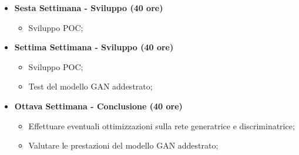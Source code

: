 {\begin{itemize}
\begin{itemize}
                  \item Raccogliere un dataset appropriato per l'addestramento del GAN;
                  \item Preprocessare il dataset per adattarlo al formato richiesto dal framework;
              \end{itemize}
        \item \textbf{Sesta Settimana - Sviluppo (40 ore)}
              \begin{itemize}
                  \item Sviluppo POC;
              \end{itemize}
        \item \textbf{Settima Settimana - Sviluppo (40 ore)}
              \begin{itemize}
                  \item Sviluppo POC;
                  \item Test del modello GAN addestrato;
              \end{itemize}
        \item \textbf{Ottava Settimana - Conclusione (40 ore)}
              \begin{itemize}
                  \item Effettuare eventuali ottimizzazioni sulla rete generatrice e discriminatrice;
                  \item Valutare le prestazioni del modello GAN addestrato;
              \end{itemize}
    \end{itemize}
}



\newcommand{\totaleOre}{320}

\newcommand{\obiettiviObbligatori}{
    \item \underline{\textit{O01}}: Comprendere il funzionamento teorico dei GAN e le loro applicazioni per la generazione di immagini.;
    \item \underline{\textit{O02}}: Sviluppare la capacità di autogestirsi e affrontare argomenti sull'argomento GAN attraverso l'autoformazione;
    \item \underline{\textit{O03}}: Sviluppo di un POC dimostrativo;

}

\newcommand{\obiettiviDesiderabili}{
    \item \underline{\textit{D01}}: Implementazione di un modello GAN per la generazione di immagini funzionante;
    \item \underline{\textit{D02}}: Generazione di immagini realistiche e coerenti con il dataset di addestramento
    \item \underline{\textit{D03}}: Personalizzare il modello GAN per l'inserimento del brand "Replay" nelle immagini di output
}

\newcommand{\obiettiviFacoltativi}{
    \item \underline{\textit{F01}}: Ottimizzazione del modello GAN
    \item \underline{\textit{F02}}: Valutare le prestazioni del modello GAN
    \item \underline{\textit{F03}}: Test applicazione prodotto finale in ambito aziendale
}